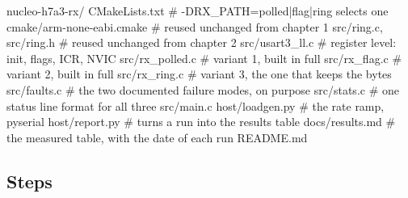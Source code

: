 \begin{plaincode}
nucleo-h7a3-rx/
  CMakeLists.txt                 # -DRX_PATH=polled|flag|ring selects one
  cmake/arm-none-eabi.cmake      # reused unchanged from chapter 1
  src/ring.c, src/ring.h         # reused unchanged from chapter 2
  src/usart3_ll.c                # register level: init, flags, ICR, NVIC
  src/rx_polled.c                # variant 1, built in full
  src/rx_flag.c                  # variant 2, built in full
  src/rx_ring.c                  # variant 3, the one that keeps the bytes
  src/faults.c                   # the two documented failure modes, on purpose
  src/stats.c                    # one status line format for all three
  src/main.c
  host/loadgen.py                # the rate ramp, pyserial
  host/report.py                 # turns a run into the results table
  docs/results.md                # the measured table, with the date of each run
  README.md
\end{plaincode}

\subsection*{Steps}

